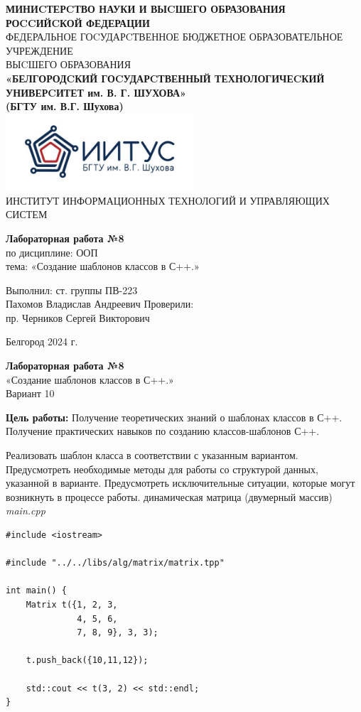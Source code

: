 \documentclass[a4paper,14pt]{extarticle}
\newcommand\textbox[1]{
	\parbox{.45\textwidth}{#1}
}
\begin{document}
\begin{center}
    \small{
        \textbf{МИНИCТЕРCТВО НАУКИ И ВЫCШЕГО ОБРАЗОВАНИЯ РОCCИЙCКОЙ ФЕДЕРАЦИИ}\\
        ФЕДЕРАЛЬНОЕ ГОCУДАРCТВЕННОЕ БЮДЖЕТНОЕ ОБРАЗОВАТЕЛЬНОЕ УЧРЕЖДЕНИЕ\\ВЫCШЕГО ОБРАЗОВАНИЯ \\
        \textbf{«БЕЛГОРОДCКИЙ ГОCУДАРCТВЕННЫЙ ТЕХНОЛОГИЧЕCКИЙ\\УНИВЕРCИТЕТ им. В. Г. ШУХОВА»\\ (БГТУ им. В.Г. Шухова)} \\
        \bigbreak
        \includegraphics[width=70mm]{log}\\
        ИНСТИТУТ ИНФОРМАЦИОННЫХ ТЕХНОЛОГИЙ И УПРАВЛЯЮЩИХ СИСТЕМ\\}
\end{center}

\vfill
\begin{center}
    \large{
        \textbf{
            Лабораторная работа №8}}\\
    \normalsize{
        по дисциплине: ООП \\
        тема: «Создание шаблонов классов в С++.»}
\end{center}
\vfill
\hfill\textbox{
    Выполнил: ст. группы ПВ-223\\Пахомов Владислав Андреевич
    \bigbreak
    Проверили: \\пр. Черников Сергей Викторович
}
\vfill\begin{center}
    Белгород 2024 г.
\end{center}
\newpage
\begin{center}
    \textbf{Лабораторная работа №8}\\
    «Создание шаблонов классов в С++.»\\
    Вариант 10
\end{center}
\textbf{Цель работы: }Получение теоретических знаний о шаблонах классов в С++.
Получение практических навыков по созданию классов-шаблонов С++.

Реализовать шаблон класса в соответствии с указанным вариантом. Предусмотреть
необходимые методы для работы со структурой данных, указанной в варианте. Предусмотреть
исключительные ситуации, которые могут возникнуть в процессе работы. динамическая матрица (двумерный массив)\\
\textit{main.cpp}
\begin{verbatim}
#include <iostream>

#include "../../libs/alg/matrix/matrix.tpp"

int main() {
    Matrix t({1, 2, 3,
              4, 5, 6,
              7, 8, 9}, 3, 3);

    t.push_back({10,11,12});

    std::cout << t(3, 2) << std::endl;
}
\end{verbatim}
\end{document}
